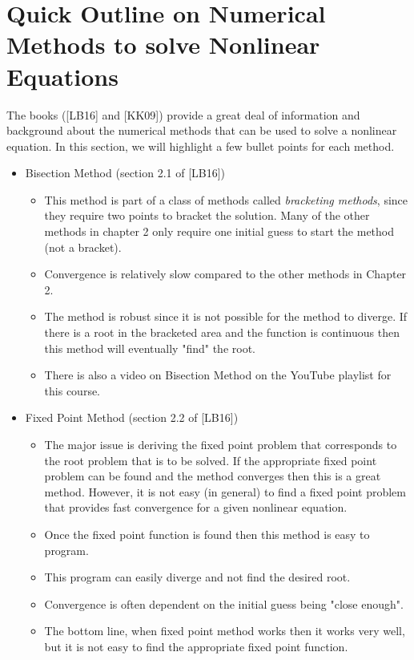 \documentclass[twoside]{article}
\renewcommand{\cite}[1]{[#1]}
\begin{document}
\section{Quick Outline on Numerical Methods to solve Nonlinear Equations}
The books (\cite{LB16} and \cite{KK09}) provide a great deal of information and background about the numerical methods that can be used to solve a nonlinear equation. In this section, we will highlight a few bullet points for each method. 

\begin{itemize}
    \item Bisection Method (section 2.1 of \cite{LB16})
    \begin{itemize}
        \item This method is part of a class of methods called {\it bracketing methods}, since they require two points to bracket the solution. Many of the other methods in chapter 2 only require one initial guess to start the method (not a bracket).
        \item Convergence is relatively slow compared to the other methods in Chapter 2.
        \item The method is robust since it is not possible for the method to diverge. If there is a root in the bracketed area and the function is continuous then this method will eventually "find" the root. 
        \item There is also a video on Bisection Method on the YouTube playlist for this course. 
    \end{itemize}
    \item Fixed Point Method (section 2.2 of \cite{LB16})
    \begin{itemize}
        \item The major issue is deriving the fixed point problem that corresponds to the root problem that is to be solved. If the appropriate fixed point problem can be found and the method converges then this is a great method. However, it is not easy (in general) to find a fixed point problem that provides fast convergence for a given nonlinear equation. 
        \item Once the fixed point function is found then this method is easy to program.
        \item This program can easily diverge and not find the desired root. 
        \item Convergence is often dependent on the initial guess being "close enough". 
        \item The bottom line, when fixed point method works then it works very well, but it is not easy to find the appropriate fixed point function.

\end{itemize}
\end{itemize}
\end{document}
